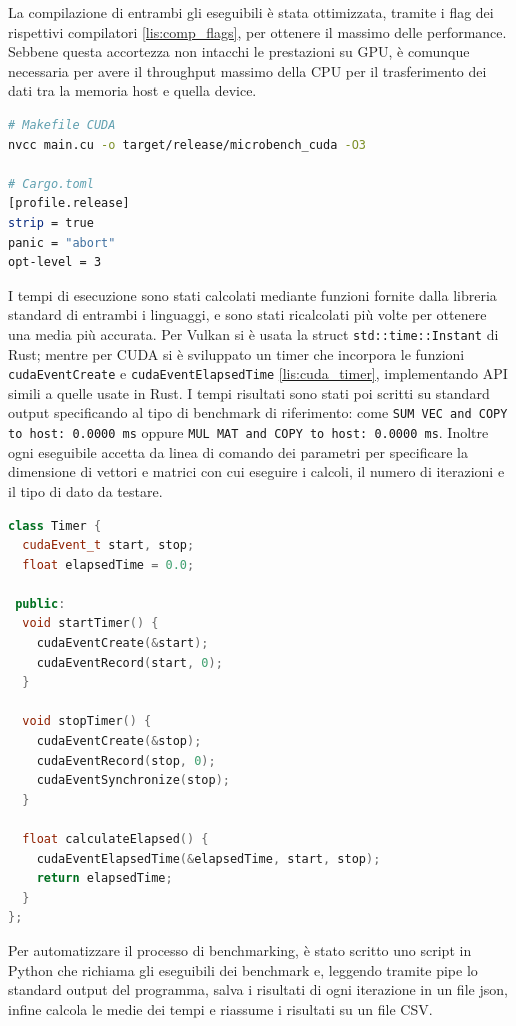 La compilazione di entrambi gli eseguibili è stata ottimizzata, tramite i flag dei rispettivi compilatori \ref{lis:comp_flags}, per ottenere il massimo delle performance. Sebbene questa accortezza non intacchi le prestazioni su GPU, è comunque necessaria per avere il throughput massimo della CPU per il trasferimento dei dati tra la memoria host e quella device.

\vspace{5mm}
\begin{lstlisting}[language=bash, caption=Impostazioni di compilazione CUDA e Rust, label=lis:comp_flags]
# Makefile CUDA
nvcc main.cu -o target/release/microbench_cuda -O3

# Cargo.toml
[profile.release]
strip = true
panic = "abort"
opt-level = 3
\end{lstlisting}
\vspace{5mm}

I tempi di esecuzione sono stati calcolati mediante funzioni fornite dalla libreria standard di entrambi i linguaggi, e sono stati ricalcolati più volte per ottenere una media più accurata. Per Vulkan si è usata la struct \verb|std::time::Instant| di Rust; mentre per CUDA si è sviluppato un timer che incorpora le funzioni \verb|cudaEventCreate| e \verb|cudaEventElapsedTime| \ref{lis:cuda_timer}, implementando API simili a quelle usate in Rust. I tempi risultati sono stati poi scritti su standard output specificando al tipo di benchmark di riferimento: come \verb|SUM VEC and COPY to host: 0.0000 ms| oppure \verb|MUL MAT and COPY to host: 0.0000 ms|. 
Inoltre ogni eseguibile accetta da linea di comando dei parametri per specificare la dimensione di vettori e matrici con cui eseguire i calcoli, il numero di iterazioni e il tipo di dato da testare.

\newpage
\vspace{5mm}
\begin{lstlisting}[language=C++, caption=Timer CUDA, label=lis:cuda_timer]
class Timer {
  cudaEvent_t start, stop;
  float elapsedTime = 0.0;

 public:
  void startTimer() {
    cudaEventCreate(&start);
    cudaEventRecord(start, 0);
  }

  void stopTimer() {
    cudaEventCreate(&stop);
    cudaEventRecord(stop, 0);
    cudaEventSynchronize(stop);
  }

  float calculateElapsed() {
    cudaEventElapsedTime(&elapsedTime, start, stop);
    return elapsedTime;
  }
};
\end{lstlisting}
\vspace{5mm}

Per automatizzare il processo di benchmarking, è stato scritto uno script in Python che richiama gli eseguibili dei benchmark e, leggendo tramite pipe lo standard output del programma, salva i risultati di ogni iterazione in un file json, infine calcola le medie dei tempi e riassume i risultati su un file CSV.



